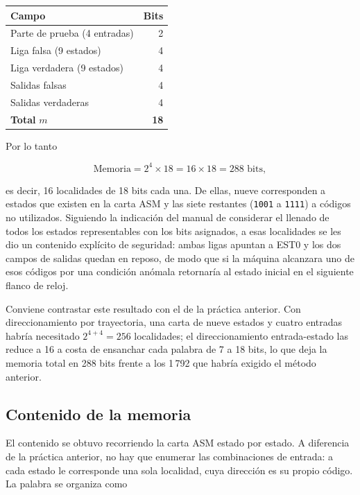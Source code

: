 \begin{center}
\begin{tabular}{@{}l r@{}}
\toprule
\textbf{Campo} & \textbf{Bits} \\
\midrule
Parte de prueba (4 entradas) & 2 \\
Liga falsa (9 estados)       & 4 \\
Liga verdadera (9 estados)   & 4 \\
Salidas falsas               & 4 \\
Salidas verdaderas           & 4 \\
\midrule
\textbf{Total} $m$           & \textbf{18} \\
\bottomrule
\end{tabular}
\end{center}

Por lo tanto

\[
\text{Memoria} = 2^{4} \times 18 = 16 \times 18 = 288 \text{ bits},
\]

es decir, 16 localidades de 18 bits cada una. De ellas, nueve corresponden a estados que
existen en la carta ASM y las siete restantes (\texttt{1001} a \texttt{1111}) a códigos no
utilizados. Siguiendo la indicación del manual de considerar el llenado de todos los
estados representables con los bits asignados, a esas localidades se les dio un contenido
explícito de seguridad: ambas ligas apuntan a EST0 y los dos campos de salidas quedan en
reposo, de modo que si la máquina alcanzara uno de esos códigos por una condición anómala
retornaría al estado inicial en el siguiente flanco de reloj.

Conviene contrastar este resultado con el de la práctica anterior. Con direccionamiento
por trayectoria, una carta de nueve estados y cuatro entradas habría necesitado
$2^{4+4} = 256$ localidades; el direccionamiento entrada-estado las reduce a 16 a costa de
ensanchar cada palabra de 7 a 18 bits, lo que deja la memoria total en 288 bits frente a
los 1\,792 que habría exigido el método anterior.

\subsection{Contenido de la memoria}

El contenido se obtuvo recorriendo la carta ASM estado por estado. A diferencia de la
práctica anterior, no hay que enumerar las combinaciones de entrada: a cada estado le
corresponde una sola localidad, cuya dirección es su propio código. La palabra se organiza
como

